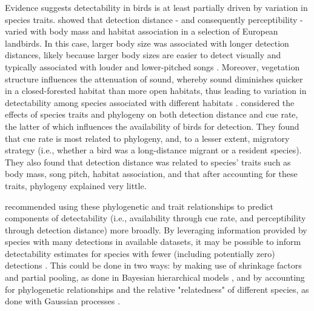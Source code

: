 \documentclass[12pt]{article}
\begin{document}
\par Evidence suggests detectability in birds is at least partially driven by variation in species traits.
\citet{johnston_species_2014} showed that detection distance - and consequently perceptibility - varied with body mass and habitat association in a selection of European landbirds.
In this case, larger body size was associated with longer detection distances, likely because  larger body sizes are easier to detect visually and typically associated with louder and lower-pitched songs \citep{bowman_adaptive_1979, fletcher_acoustics_1999, ryan_role_1985}.
Moreover, vegetation structure influences the attenuation of sound, whereby sound diminishes quicker in a closed-forested habitat than more open habitats, thus leading to variation in detectability among species associated with different habitats \citep{waide_tropical_1988, yip_sound_2017}.
\citet{solymos_phylogeny_2018} considered the effects of species traits and phylogeny on both detection distance and cue rate, the latter of which influences the availability of birds for detection.
They found that cue rate is most related to phylogeny, and, to a lesser extent, migratory strategy (i.e., whether a bird was a long-distance migrant or a resident species).
They also found that detection distance was related to species’ traits such as body mass, song pitch, habitat association, and that after accounting for these traits, phylogeny explained very little.

\par \citet{solymos_phylogeny_2018} recommended using these phylogenetic and trait relationships to predict components of detectability (i.e., availability through cue rate, and perceptibility through detection distance) more broadly.
 By leveraging information provided by species with many detections in available datasets, it may be possible to inform detectability estimates for species with fewer (including potentially zero) detections \citep{sollmann_hierarchical_2016, pacifici_guidelines_2014, zipkin_impacts_2009, white_conservation_2013}.
This could be done in two ways: by making use of shrinkage factors and partial pooling, as done in Bayesian hierarchical models \citep{gelman_what_2021, gelman_bayesian_2006}, and by accounting for phylogenetic relationships and the relative "relatedness" of different species, as done with Gaussian processes \citep{bernardo_regression_1998, mcelreath_continous_2020}.
\end{document}

